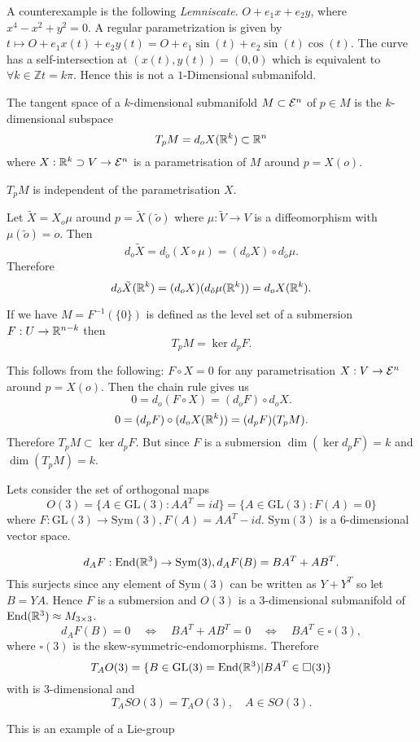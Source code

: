 \begin{example}
	A counterexample is the following \emph{Lemniscate}.
	$ O + e_1x + e_2y $, where $ x^4 - x^2 + y^2 = 0 $. A regular parametrization is given by $ t \mapsto O + e_1 x(t) + e_2 y(t) = O + e_1 \sin(t) + e_2\sin(t)\cos(t). $ 
	The curve has a self-intersection at $ (x(t),y(t))=(0,0) $ which is equivalent to $ \forall k \in \mathbb{Z} t = k\pi $. Hence this is not a $ 1$-Dimensional submanifold.
\end{example}

\begin{definition}
	The tangent space of a $k$-dimensional submanifold $M \subset \mathcal E^n$ of $p \in M$ is the $k$-dimensional subspace
		\[ T_pM = d_oX(\mathbb R^k) \subset \mathbb R^n \]
	where $X: \mathbb R^k \supset V  \to \mathcal E^n$ is a parametrisation of $M$ around $p=X(o)$.
\end{definition}

\begin{remark}
	$T_pM$ is independent of the parametrisation $X$.
	
	Let $\tilde X = X_o\mu$ around $p = \tilde X (\tilde o)$ where $\mu: \tilde V \to V $ is a diffeomorphism with $\mu(\tilde o)=o$. Then
		\[ d_o\tilde X = d_{\tilde o}(X \circ \mu) = (d_oX)\circ d_{\tilde o}\mu. \]
	Therefore
		\[ d_{\tilde o}\tilde X(\mathbb R^k) = (d_oX)(d_{\tilde o}\mu(\mathbb R^k)) = d_oX(\mathbb R^k). \]
\end{remark}

\begin{remark}
	If we have $M=F^{-1}(\{0\})$ is defined as the level set of a submersion $F: U \to \mathbb R^{n-k}$ then 
		\[ T_pM = \ker d_pF. \]
		
	This follows from the following: 
	$F \circ X=0$ for any parametrisation $X:V \to \mathcal E^n$ around $p=X(o)$. Then the chain rule gives us
		\[ 0 = d_o(F \circ X) = (d_oF)\circ d_oX. \]
		\[ 0= (d_pF)\circ (d_oX(\mathbb R^k)) = (d_pF)(T_pM). \]
	Therefore $T_pM \subset \ker d_pF$. But since $F$ is a submersion $\dim (\ker d_pF)=k$ and $\dim(T_pM)=k$.
\end{remark}

\begin{example}
	Lets consider the set of orthogonal maps 
		\[ O(3)=\{ A \in \mathrm{GL}(3): AA^T = id \}
		= \{ A \in \mathrm{GL}(3): F(A)=0 \} \]
	where $F: \mathrm{GL}(3) \to \mathrm{Sym}(3), F(A) = AA^T-id$. $ \mathrm{Sym}(3) $ is a $6$-dimensional vector space.
	
		\[ d_AF: \mathrm{End}(\mathbb R^3) \to \mathrm{Sym}(3), d_AF(B) = BA^T + AB^T. \]
	This surjects since any element of $\mathrm{Sym}(3)$ can be written as $Y+Y^T$ so let $B=YA$. Hence $F$ is a submersion and $O(3)$ is a $3$-dimensional submanifold of $\mathrm{End}(\mathbb R^3) \approx M_{3 \times 3}$.
		\[ d_AF(B) = 0 \quad \Longleftrightarrow \quad
			BA^T + AB^T=0 \quad\Longleftrightarrow\quad
			BA^T \in \square(3), \]
	where $\square(3)$ is the skew-symmetric-endomorphisms. Therefore
		\[ T_AO(3) = \{ B \in \mathrm{GL}(3)= \mathrm{End}(\mathbb R^3) | BA^T \in \square(3) \} \]
	with is $3$-dimensional and
		\[ T_ASO(3) = T_AO(3), \quad A \in SO(3). \]
	
	This is an example of a Lie-group
\end{example}

